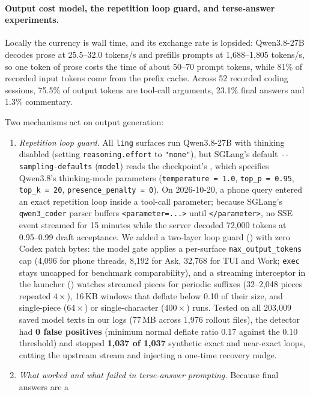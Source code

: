 \documentclass[11pt]{article}
\newcommand{\code}[1]{\texttt{#1}}
\begin{document}
\paragraph{Output cost model, the repetition loop guard, and terse-answer experiments.} Locally the
currency is wall time, and its exchange rate is lopsided: Qwen3.8-27B decodes prose at 25.5--32.0
tokens/s and prefills prompts at 1{,}688--1{,}805 tokens/s, so one token of prose costs the time of
about 50--70 prompt tokens, while 81\% of recorded input tokens come from the prefix cache. Across
52 recorded coding sessions, 75.5\% of output tokens are tool-call arguments, 23.1\% final answers
and 1.3\% commentary.

Two mechanisms act on output generation:
\begin{enumerate}
\item \emph{Repetition loop guard.} All \code{ling} surfaces run Qwen3.8-27B with thinking disabled
(setting \code{reasoning.effort} to \code{"none"}), but SGLang's default
\code{-{}-sampling-defaults} (\code{model}) reads the checkpoint's ,
which specifies Qwen3.8's thinking-mode parameters (\code{temperature = 1.0}, \code{top\_p = 0.95},
\code{top\_k = 20}, \code{presence\_penalty = 0}). On 2026-10-20, a phone query entered an exact repetition loop inside
a tool-call parameter; because SGLang's \code{qwen3\_coder} parser buffers \code{<parameter=...>}
until \code{</parameter>}, no SSE event streamed for 15 minutes while the server decoded 72{,}000
tokens at 0.95--0.99 draft acceptance. We added a two-layer loop guard
() with zero Codex patch bytes: the model gate applies a per-surface
\code{max\_output\_tokens} cap (4{,}096 for phone threads, 8{,}192 for Ask, 32{,}768 for TUI and
Work; \code{exec} stays uncapped for benchmark comparability), and a streaming interceptor in the
launcher () watches streamed pieces for periodic suffixes (32--2{,}048
pieces repeated $4\times$), 16\,KB windows that deflate below 0.10 of their size, and single-piece
($64\times$) or single-character ($400\times$) runs. Tested on all 203{,}009 saved model texts in
our logs (77\,MB across 1{,}976 rollout files), the detector had \textbf{0 false positives}
(minimum normal deflate ratio 0.17 against the 0.10 threshold) and stopped \textbf{1{,}037 of
1{,}037} synthetic exact and near-exact loops, cutting the upstream stream and injecting a one-time
recovery nudge.
\item \emph{What worked and what failed in terse-answer prompting.} Because final answers are a

\end{enumerate}
\end{document}
